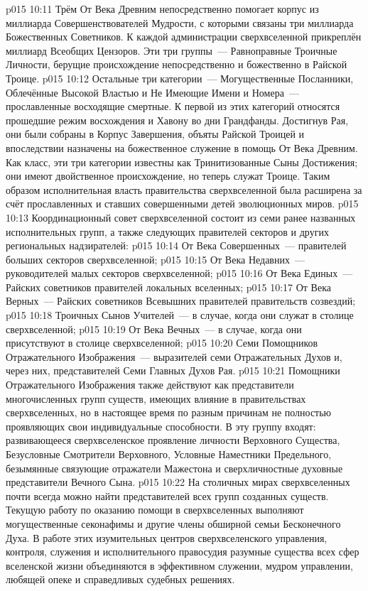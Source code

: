 \vs p015 10:11 \pc Трём От Века Древним непосредственно помогает корпус из миллиарда Совершенствователей Мудрости, с которыми связаны три миллиарда Божественных Советников. К каждой администрации сверхвселенной прикреплён миллиард Всеобщих Цензоров. Эти три группы~--- Равноправные Троичные Личности, берущие происхождение непосредственно и божественно в Райской Троице.
\vs p015 10:12 Остальные три категории~--- Могущественные Посланники, Облечённые Высокой Властью и Не Имеющие Имени и Номера~--- прославленные восходящие смертные. К первой из этих категорий относятся прошедшие режим восхождения и Хавону во дни Грандфанды. Достигнув Рая, они были собраны в Корпус Завершения, объяты Райской Троицей и впоследствии назначены на божественное служение в помощь От Века Древним. Как класс, эти три категории известны как Тринитизованные Сыны Достижения; они имеют двойственное происхождение, но теперь служат Троице. Таким образом исполнительная власть правительства сверхвселенной была расширена за счёт прославленных и ставших совершенными детей эволюционных миров.
\vs p015 10:13 Координационный совет сверхвселенной состоит из семи ранее названных исполнительных групп, а также следующих правителей секторов и других региональных надзирателей:
\vs p015 10:14 От Века Совершенных~--- правителей больших секторов сверхвселенной;
\vs p015 10:15 От Века Недавних~--- руководителей малых секторов сверхвселенной;
\vs p015 10:16 От Века Единых~--- Райских советников правителей локальных вселенных;
\vs p015 10:17 От Века Верных~--- Райских советников Всевышних правителей правительств созвездий;
\vs p015 10:18 Троичных Сынов Учителей~--- в случае, когда они служат в столице сверхвселенной;
\vs p015 10:19 От Века Вечных~--- в случае, когда они присутствуют в столице сверхвселенной;
\vs p015 10:20 Семи Помощников Отражательного Изображения~--- выразителей семи Отражательных Духов и, через них, представителей Семи Главных Духов Рая.
\vs p015 10:21 \pc Помощники Отражательного Изображения также действуют как представители многочисленных групп существ, имеющих влияние в правительствах сверхвселенных, но в настоящее время по разным причинам не полностью проявляющих свои индивидуальные способности. В эту группу входят: развивающееся сверхвселенское проявление личности Верховного Существа, Безусловные Смотрители Верховного, Условные Наместники Предельного, безымянные связующие отражатели Мажестона и сверхличностные духовные представители Вечного Сына.
\vs p015 10:22 \pc На столичных мирах сверхвселенных почти всегда можно найти представителей всех групп созданных существ. Текущую работу по оказанию помощи в сверхвселенных выполняют могущественные секонафимы и другие члены обширной семьи Бесконечного Духа. В работе этих изумительных центров сверхвселенского управления, контроля, служения и исполнительного правосудия разумные существа всех сфер вселенской жизни объединяются в эффективном служении, мудром управлении, любящей опеке и справедливых судебных решениях.
